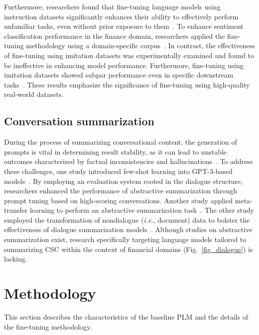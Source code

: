 \documentclass[sigconf]{acmart}
\begin{document}
Furthermore, researchers found that fine-tuning language models using instruction datasets significantly enhances their ability to effectively perform unfamiliar tasks, even without prior exposure to them~\cite{wei2022finetuned}. To enhance sentiment classification performance in the finance domain, researchers applied the fine-tuning methodology using a domain-specific corpus~\cite{araci2019finbert}. In contrast, the effectiveness of fine-tuning using imitation datasets was experimentally examined and found to be ineffective in enhancing model performance. Furthermore, fine-tuning using imitation datasets showed subpar performance even in specific downstream tasks~\cite{gudibande2023false}. These results emphasize the significance of fine-tuning using high-quality real-world datasets.




\subsection{Conversation summarization}
During the process of summarizing conversational content, the generation of prompts is vital in  determining result stability, as it can lead to unstable outcomes characterized by factual inconsistencies and hallucinations~\cite{maynez-etal-2020-faithfulness, ladhak-etal-2022-faithful, huang2023}. To address these challenges, one study introduced few-shot learning into GPT-3-based models~\cite{Prodan2022}. By employing an evaluation system rooted in the dialogue structure, researchers enhanced the performance of abstractive summarization through prompt tuning based on high-scoring conversations. Another study applied meta-transfer learning to perform an abstractive summarization task~\cite{Chen_Shuai_2021}. The other study employed the transformation of nondialogue ({\it i.e.}, document) data to bolster the effectiveness of dialogue summarization models~\cite{park-etal-2022-leveraging}. Although studies on abstractive summarization exist, research specifically targeting language models tailored to summarizing CSC within the context of financial domains (Fig.~\ref{fig_dialogue}) is lacking.



\section{Methodology}\label{methodology}
This section describes the characteristics of the baseline PLM and the details of the fine-tuning methodology.
\end{document}
